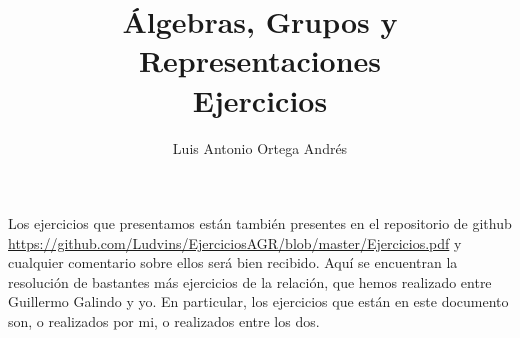 \documentclass[UTF8]{article}
\begin{document}
\title{Álgebras, Grupos y Representaciones \\
      \large Ejercicios
  }

\author{Luis Antonio Ortega Andrés}

\maketitle

Los ejercicios que presentamos están también presentes en el repositorio de
github \url{https://github.com/Ludvins/EjerciciosAGR/blob/master/Ejercicios.pdf}
y cualquier comentario sobre ellos será bien recibido. Aquí se encuentran la
resolución de bastantes más ejercicios de la relación, que hemos realizado entre
Guillermo Galindo y yo. En particular, los ejercicios que están en este documento son, o realizados por mi, o realizados entre los dos.




\end{document}
